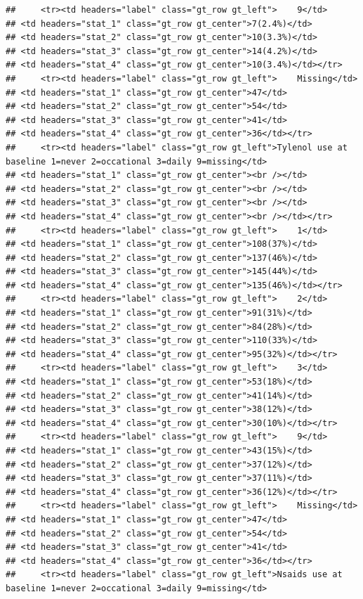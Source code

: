 \documentclass{article}
\begin{document}
\begin{verbatim}
##     <tr><td headers="label" class="gt_row gt_left">    9</td>
## <td headers="stat_1" class="gt_row gt_center">7(2.4%)</td>
## <td headers="stat_2" class="gt_row gt_center">10(3.3%)</td>
## <td headers="stat_3" class="gt_row gt_center">14(4.2%)</td>
## <td headers="stat_4" class="gt_row gt_center">10(3.4%)</td></tr>
##     <tr><td headers="label" class="gt_row gt_left">    Missing</td>
## <td headers="stat_1" class="gt_row gt_center">47</td>
## <td headers="stat_2" class="gt_row gt_center">54</td>
## <td headers="stat_3" class="gt_row gt_center">41</td>
## <td headers="stat_4" class="gt_row gt_center">36</td></tr>
##     <tr><td headers="label" class="gt_row gt_left">Tylenol use at baseline 1=never 2=occational 3=daily 9=missing</td>
## <td headers="stat_1" class="gt_row gt_center"><br /></td>
## <td headers="stat_2" class="gt_row gt_center"><br /></td>
## <td headers="stat_3" class="gt_row gt_center"><br /></td>
## <td headers="stat_4" class="gt_row gt_center"><br /></td></tr>
##     <tr><td headers="label" class="gt_row gt_left">    1</td>
## <td headers="stat_1" class="gt_row gt_center">108(37%)</td>
## <td headers="stat_2" class="gt_row gt_center">137(46%)</td>
## <td headers="stat_3" class="gt_row gt_center">145(44%)</td>
## <td headers="stat_4" class="gt_row gt_center">135(46%)</td></tr>
##     <tr><td headers="label" class="gt_row gt_left">    2</td>
## <td headers="stat_1" class="gt_row gt_center">91(31%)</td>
## <td headers="stat_2" class="gt_row gt_center">84(28%)</td>
## <td headers="stat_3" class="gt_row gt_center">110(33%)</td>
## <td headers="stat_4" class="gt_row gt_center">95(32%)</td></tr>
##     <tr><td headers="label" class="gt_row gt_left">    3</td>
## <td headers="stat_1" class="gt_row gt_center">53(18%)</td>
## <td headers="stat_2" class="gt_row gt_center">41(14%)</td>
## <td headers="stat_3" class="gt_row gt_center">38(12%)</td>
## <td headers="stat_4" class="gt_row gt_center">30(10%)</td></tr>
##     <tr><td headers="label" class="gt_row gt_left">    9</td>
## <td headers="stat_1" class="gt_row gt_center">43(15%)</td>
## <td headers="stat_2" class="gt_row gt_center">37(12%)</td>
## <td headers="stat_3" class="gt_row gt_center">37(11%)</td>
## <td headers="stat_4" class="gt_row gt_center">36(12%)</td></tr>
##     <tr><td headers="label" class="gt_row gt_left">    Missing</td>
## <td headers="stat_1" class="gt_row gt_center">47</td>
## <td headers="stat_2" class="gt_row gt_center">54</td>
## <td headers="stat_3" class="gt_row gt_center">41</td>
## <td headers="stat_4" class="gt_row gt_center">36</td></tr>
##     <tr><td headers="label" class="gt_row gt_left">Nsaids use at baseline 1=never 2=occational 3=daily 9=missing</td>

\end{verbatim}
\end{document}
